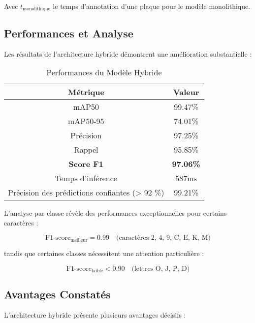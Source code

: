 \documentclass[letterpaper, 10 pt, conference]{ieeeconf}  %
\begin{document}
Avec $t_{\text{monolithique}}$ le temps d'annotation d'une plaque
pour le modèle monolithique.

\subsection{Performances et Analyse}

Les résultats de l'architecture hybride démontrent une amélioration substantielle :

\begin{table}[h]
\caption{Performances du Modèle Hybride}
\label{table_hybride}
\begin{center}
\begin{tabular}{|c|c|}
\hline
\textbf{Métrique} & \textbf{Valeur} \\
\hline
mAP50 & 99.47\% \\
\hline
mAP50-95 & 74.01\% \\
\hline
Précision & 97.25\% \\
\hline
Rappel & 95.85\% \\
\hline
\textbf{Score F1} & \textbf{97.06\%} \\
\hline
Temps d'inférence & 587ms \\
\hline
Précision des prédictions confiantes (> 92 \%) & 99.21\% \\
\hline
\end{tabular}
\end{center}
\end{table}

L'analyse par classe révèle des performances exceptionnelles pour certains caractères :

\begin{equation}
\text{F1-score}_{\text{meilleur}} = 0.99 \quad \text{(caractères 2, 4, 9, C, E, K, M)}
\end{equation}

tandis que certaines classes nécessitent une attention particulière :

\begin{equation}
\text{F1-score}_{\text{faible}} < 0.90 \quad \text{(lettres O, J, P, D)}
\end{equation}

\subsection{Avantages Constatés}

L'architecture hybride présente plusieurs avantages décisifs :
\end{document}

